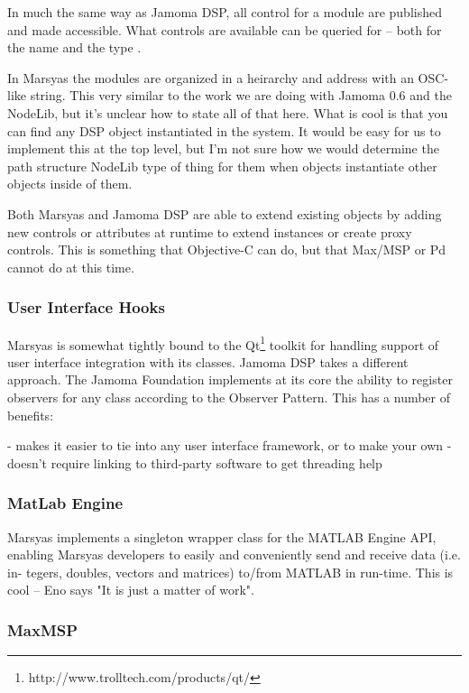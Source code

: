 \documentclass[twoside,10pt]{article}
\begin{document}
In much the same way as Jamoma DSP, all control for a module are published and made accessible.  What controls are available can be queried for -- both for the name and the type  \cite{Tzanetakis:2006}.  

In Marsyas the modules are organized in a heirarchy and address with an OSC-like string.  This very similar to the work we are doing with Jamoma 0.6 and the NodeLib, but it's unclear how to state all of that here.  What is cool is that you can find any DSP object instantiated in the system.  It would be easy for us to implement this at the top level, but I'm not sure how we would determine the path structure NodeLib type of thing for them when objects instantiate other objects inside of them.

Both Marsyas and Jamoma DSP are able to extend existing objects by adding new controls or attributes at runtime to extend instances or create proxy controls.  This is something that Objective-C can do, but that Max/MSP or Pd cannot do at this time.

\subsubsection{User Interface Hooks}

Marsyas is somewhat tightly bound to the Qt\footnote{http://www.trolltech.com/products/qt/} toolkit for handling support of user interface integration with its classes.  Jamoma DSP takes a different approach.  The Jamoma Foundation implements at its core the ability to register observers for any class according to the Observer Pattern\cite{Gamma:1995}.  This has a number of benefits:

- makes it easier to tie into any user interface framework, or to make your own
- doesn't require linking to third-party software to get threading help

\subsubsection{MatLab Engine}

Marsyas implements a singleton wrapper class for the MATLAB Engine API, enabling Marsyas developers to easily and conveniently send and receive data (i.e. in- tegers, doubles, vectors and matrices) to/from MATLAB in run-time.  This is cool -- Eno says "It is just a matter of work".

\subsubsection{MaxMSP}
\end{document}
